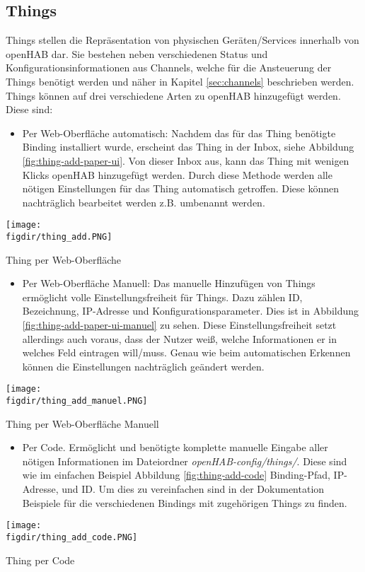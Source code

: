 \subsection{Things}
Things stellen die Repräsentation von physischen Geräten/Services innerhalb von openHAB dar. Sie bestehen neben verschiedenen Status und Konfigurationsinformationen aus Channels, welche für die Ansteuerung der Things benötigt werden und näher in Kapitel \ref{sec:channels} beschrieben werden.
Things können auf drei verschiedene Arten zu openHAB hinzugefügt werden. Diese sind:
\begin{itemize}
	\item Per Web-Oberfläche automatisch: Nachdem das für das Thing benötigte Binding installiert wurde, erscheint das Thing in der Inbox, siehe Abbildung \ref{fig:thing-add-paper-ui}. Von dieser Inbox aus, kann das Thing mit wenigen Klicks openHAB hinzugefügt werden. Durch diese Methode werden alle nötigen Einstellungen für das Thing automatisch getroffen. Diese können nachträglich bearbeitet werden z.B. umbenannt werden. 
\end{itemize}
{
	\centering
	\captionsetup{type=figure}
	\texttt{[image: \\figdir/thing\_add.PNG]}
	\caption{Thing per Web-Oberfläche \label{fig:thing-add-paper-ui}}
}	
\begin{itemize}	
	\item Per Web-Oberfläche Manuell: Das manuelle Hinzufügen von Things ermöglicht volle Einstellungsfreiheit für Things. Dazu zählen ID, Bezeichnung, IP-Adresse und Konfigurationsparameter. Dies ist in Abbildung \ref{fig:thing-add-paper-ui-manuel} zu sehen. Diese Einstellungsfreiheit setzt allerdings auch voraus, dass der Nutzer weiß, welche Informationen er in welches Feld eintragen will/muss. Genau wie beim automatischen Erkennen können die Einstellungen nachträglich geändert werden. 
\end{itemize}
{
	\centering
	\captionsetup{type=figure}
	\texttt{[image: \\figdir/thing\_add\_manuel.PNG]}
	\caption{Thing per Web-Oberfläche Manuell \label{fig:thing-add-paper-ui-manuel}}
}
\begin{itemize}	
	\item Per Code. Ermöglicht und benötigte komplette manuelle Eingabe aller nötigen Informationen im Dateiordner  \textit{openHAB-config/things/}. Diese sind wie im einfachen Beispiel Abbildung \ref{fig:thing-add-code} Binding-Pfad, IP-Adresse, und ID. Um dies zu vereinfachen sind in der Dokumentation Beispiele für die verschiedenen Bindings mit zugehörigen Things zu finden.
\end{itemize}
{
	\centering
	\captionsetup{type=figure}
	\texttt{[image: \\figdir/thing\_add\_code.PNG]}
	\caption{Thing per Code \label{fig:thing-add-code}}
}

